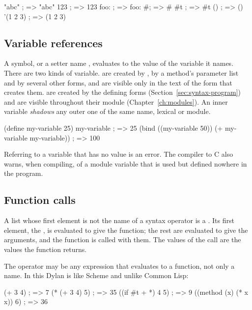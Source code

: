 \begin{dylan}
"abc"      ; => "abc"
123        ; => 123
foo:       ; => foo:
#\a        ; => #\a
#t         ; => #t
()         ; => ()
'(1 2 3)   ; => (1 2 3)
\end{dylan}

\subsection{Variable references}

A symbol, or a setter name , evaluates to the
value of the variable it names. There are two kinds of variable.
 are created by , by a method's parameter
list and by several other forms, and are visible only in the text of the
form that creates them.  are created by the defining
forms (Section~\ref{sec:syntax-program}) and are visible throughout their module
(Chapter~\ref{ch:modules}). An inner variable \emph{shadows} any outer one of the
same name, lexical or module.

\begin{dylan}
(define my-variable 25)
my-variable                     ; => 25
(bind ((my-variable 50))
  (+ my-variable my-variable))  ; => 100
\end{dylan}

\noindent Referring to a variable that has no value is an error. The
compiler to C also warns, when compiling, of a module variable that is used
but defined nowhere in the program.

\subsection{Function calls}\label{sec:syntax-calls}

A list whose first element is not the name of a syntax operator is a
. Its first element, the , is evaluated
to give the function; the rest are evaluated to give the arguments, and the
function is called with them. The values of the call are the values the
function returns.

The operator may be any expression that evaluates to a function, not only a
name. In this Dylan is like Scheme and unlike Common Lisp:

\begin{dylan}
(+ 3 4)              ; => 7
(* (+ 3 4) 5)        ; => 35
((if #t + *) 4 5)    ; => 9
((method (x) (* x x)) 6)   ; => 36
\end{dylan}

